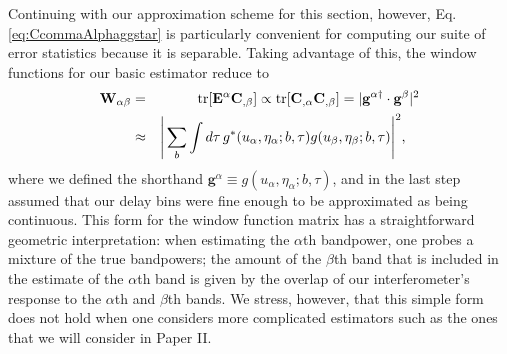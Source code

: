 \documentclass[twocolumn,aps,prd,nofootinbib,showpacs]{revtex4-1}
\begin{document}
Continuing with our approximation scheme for this section, however, Eq. \eqref{eq:CcommaAlphaggstar} is particularly convenient for computing our suite of error statistics because it is separable.  Taking advantage of this, the window functions for our basic estimator reduce to
\begin{eqnarray}
\mathbf{W}_{\alpha \beta} &=& \textrm{tr} [ \mathbf{E}^\alpha \mathbf{C}_{,\beta} ] \propto  \textrm{tr} [\mathbf{C}_{,\alpha}  \mathbf{C}_{,\beta}] = | \mathbf{g}^{\alpha \dagger} \cdot \mathbf{g}^{\beta}|^2 \nonumber \\ 
& \approx & \Bigg{|} \sum_{b} \int d\tau \, g^*(u_\alpha, \eta_\alpha; b, \tau) g (u_\beta, \eta_\beta; b, \tau) \Bigg{|}^2,\quad \label{eq:simplifiedWind}
\end{eqnarray}
where we defined the shorthand $\mathbf{g}^\alpha \equiv g(u_\alpha, \eta_\alpha; b, \tau)$, and in the last step assumed that our delay bins were fine enough to be approximated as being continuous.  This form for the window function matrix has a straightforward geometric interpretation: when estimating the $\alpha$th bandpower, one probes a mixture of the true bandpowers; the amount of the $\beta$th band that is included in the estimate of the $\alpha$th band is given by the overlap of our interferometer's response to the $\alpha$th and $\beta$th bands.  We stress, however, that this simple form does not hold when one considers more complicated estimators such as the ones that we will consider in Paper II.
\end{document}
